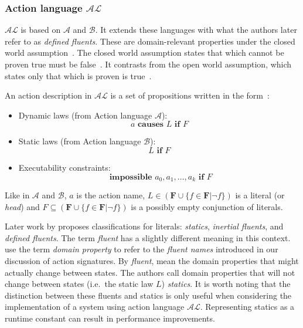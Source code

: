 \subsubsection{Action language $ \mathcal{AL} $}
\label{subsubsec:action_language_al}

$ \mathcal{AL} $ is based on $ \mathcal{A} $ and $ \mathcal{B} $.
It extends these languages with what the authors later refer to as \textit{defined fluents}.
These are domain-relevant properties under the closed world assumption~\citep{blount_architecture_2013}.
The closed world assumption states that which cannot be proven true must be false~\citep{reiter_closed_1981}.
It contrasts from the open world assumption, which states only that which is proven is true~\citep{reiter_closed_1981}.

An action description in $ \mathcal{AL} $ is a set of propositions written in the form~\citep{baral_reasoning_2000, blount_architecture_2013}:

\begin{itemize}
    \item Dynamic laws (from Action language $ \mathcal{A} $):
        $$
        a \textbf{ causes } L \textbf{ if } F
        $$

    \item Static laws (from Action language $ \mathcal{B} $):
        $$
        L \textbf{ if } F
        $$

    \item Executability constraints:
        $$
        \textbf{ impossible } a_0, a_1, \dots, a_k \textbf{ if } F
        $$
\end{itemize}

Like in $\mathcal{A}$ and $\mathcal{B}$, $a$ is the action name, $L \in(\boldsymbol{F} \cup\{f \in \boldsymbol{F}| \neg f\}) $ is a literal (or \textit{head}) and $F \subseteq(\boldsymbol{F} \cup\{f \in \boldsymbol{F}| \neg f\})$ is a possibly empty conjunction of literals.

Later work by \citet{gelfond_knowledge_2014} proposes classifications for literals: \textit{statics}, \textit{inertial fluents}, and \textit{defined fluents}.
The term \textit{fluent} has a slightly different meaning in this context.
\citet{gelfond_knowledge_2014} use the term \textit{domain property} to refer to the \textit{fluent names} introduced in our discussion of action signatures.
By \textit{fluent}, \citet{gelfond_knowledge_2014} mean the domain properties that might actually change between states.
The authors call domain properties that will not change between states (i.e.~the static law $L$) \textit{statics}.
It is worth noting that the distinction between these fluents and statics is only useful when considering the implementation of a system using action language $\mathcal{AL}$.
Representing statics as a runtime constant can result in performance improvements.

